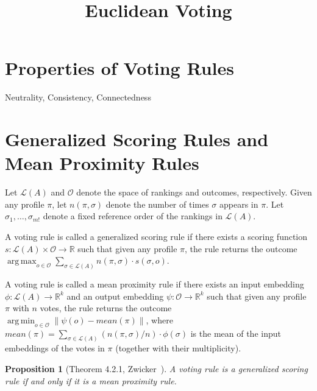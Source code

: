 \documentclass[10pt,letterpaper]{article}
\title{Euclidean Voting}
\newcommand{\calL}{{\mathcal{L}}}
\newcommand{\rank}{{\calL(A)}}
\newcommand{\calO}{{\mathcal{O}}}
\DeclareMathOperator*{\argmax}{arg\,max}
\DeclareMathOperator*{\argmin}{arg\,min}
\newtheorem{proposition}{Proposition}
\newenvironment{definition}[1][Definition]{\begin{trivlist}
\item[\hskip \labelsep {\bfseries #1}]}{\end{trivlist}}
\begin{document}
\maketitle


\section{Properties of Voting Rules}

Neutrality, Consistency, Connectedness

\section{Generalized Scoring Rules and Mean Proximity Rules}
Let $\rank$ and $\calO$ denote the space of rankings and outcomes, respectively. Given any profile $\pi$, let $n(\pi,\sigma)$ denote the number of times $\sigma$ appears in $\pi$. Let $\sigma_1,\ldots,\sigma_{m!}$ denote a fixed reference order of the rankings in $\rank$. 

\begin{definition}[Generalized Scoring Rules (Zwicker~\cite{Zwicker08a})]
A voting rule is called a generalized scoring rule if there exists a scoring function $s : \rank \times \calO \rightarrow \mathbb{R}$ such that given any profile $\pi$, the rule returns the outcome $\argmax_{o \in \calO} \sum_{\sigma \in \rank} n(\pi,\sigma) \cdot s(\sigma,o)$. 
\end{definition}

\begin{definition}[Mean Proximity Rules (Zwicker~\cite{Zwicker08a})]
A voting rule is called a mean proximity rule if there exists an input embedding $\phi : \rank \rightarrow \mathbb{R}^k$ and an output embedding $\psi: \calO \rightarrow \mathbb{R}^k$ such that given any profile $\pi$ with $n$ votes, the rule returns the outcome $\argmin_{o \in \calO} \|\psi(o) - mean(\pi) \|$, where $mean(\pi) = \sum_{\sigma \in \rank} (n(\pi,\sigma)/n) \cdot \phi(\sigma)$ is the mean of the input embeddings of the votes in $\pi$ (together with their multiplicity). 
\end{definition}

\begin{proposition}[Theorem 4.2.1, Zwicker~\cite{Zwicker08a}]
A voting rule is a generalized scoring rule if and only if it is a mean proximity rule.
\label{prop:equiv}
\end{proposition}
\end{document}
